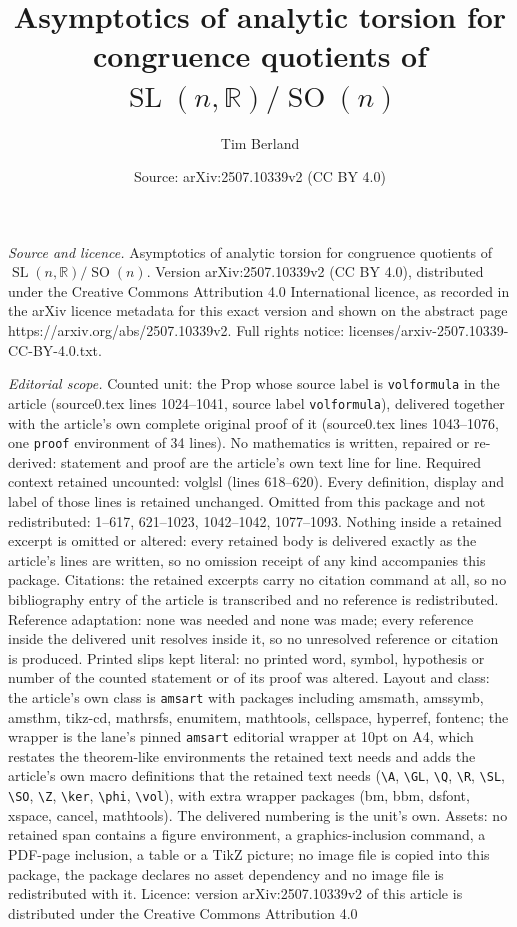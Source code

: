 \documentclass[10pt,a4paper]{amsart}
\title[Asymptotics of analytic torsion for congruence quotients of ]{Asymptotics of analytic torsion for congruence quotients of $\operatorname{SL}(n,\mathbb{R})/\operatorname{SO}(n)$}
\author{Tim Berland}
\date{Source: arXiv:2507.10339v2 (CC BY 4.0)}
\begin{document}
\maketitle

\noindent\emph{Source and licence.} Asymptotics of analytic torsion for congruence quotients of $\operatorname{SL}(n,\mathbb{R})/\operatorname{SO}(n)$. Version arXiv:2507.10339v2 (CC BY 4.0), distributed under the Creative Commons Attribution 4.0 International licence, as recorded in the arXiv licence metadata for this exact version and shown on the abstract page https://arxiv.org/abs/2507.10339v2. Full rights notice: licenses/arxiv-2507.10339-CC-BY-4.0.txt.\par\smallskip

\noindent\textit{Editorial scope.} Counted unit: the Prop whose source label is \texttt{volformula} in the article (source0.tex lines 1024--1041, source label \texttt{volformula}), delivered together with the article's own complete original proof of it (source0.tex lines 1043--1076, one \texttt{proof} environment of 34 lines). No mathematics is written, repaired or re-derived: statement and proof are the article's own text line for line. Required context retained uncounted: volglsl (lines 618--620). Every definition, display and label of those lines is retained unchanged. Omitted from this package and not redistributed: 1--617, 621--1023, 1042--1042, 1077--1093. Nothing inside a retained excerpt is omitted or altered: every retained body is delivered exactly as the article's lines are written, so no omission receipt of any kind accompanies this package. Citations: the retained excerpts carry no citation command at all, so no bibliography entry of the article is transcribed and no reference is redistributed. Reference adaptation: none was needed and none was made; every reference inside the delivered unit resolves inside it, so no unresolved reference or citation is produced. Printed slips kept literal: no printed word, symbol, hypothesis or number of the counted statement or of its proof was altered. Layout and class: the article's own class is \texttt{amsart} with packages including amsmath, amssymb, amsthm, tikz-cd, mathrsfs, enumitem, mathtools, cellspace, hyperref, fontenc; the wrapper is the lane's pinned \texttt{amsart} editorial wrapper at 10pt on A4, which restates the theorem-like environments the retained text needs and adds the article's own macro definitions that the retained text needs (\texttt{\textbackslash A}, \texttt{\textbackslash GL}, \texttt{\textbackslash Q}, \texttt{\textbackslash R}, \texttt{\textbackslash SL}, \texttt{\textbackslash SO}, \texttt{\textbackslash Z}, \texttt{\textbackslash ker}, \texttt{\textbackslash phi}, \texttt{\textbackslash vol}), with extra wrapper packages (bm, bbm, dsfont, xspace, cancel, mathtools). The delivered numbering is the unit's own. Assets: no retained span contains a figure environment, a graphics-inclusion command, a PDF-page inclusion, a table or a TikZ picture; no image file is copied into this package, the package declares no asset dependency and no image file is redistributed with it. Licence: version arXiv:2507.10339v2 of this article is distributed under the Creative Commons Attribution 4.0 
\end{document}
